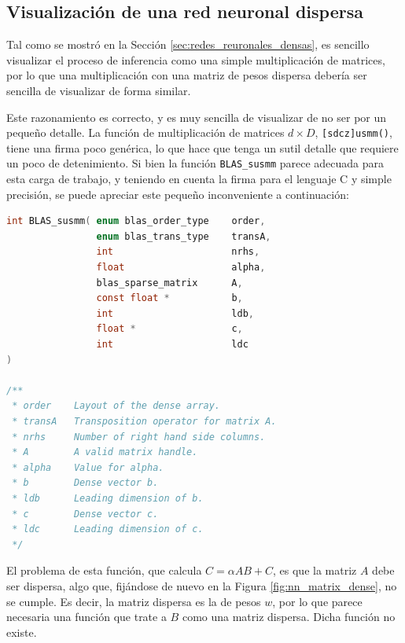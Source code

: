 \subsection{Visualización de una red neuronal dispersa}
\label{ssec:visualizacion_nn_dispersa}
Tal como se mostró en la Sección \ref{sec:redes_reuronales_densas}, es sencillo visualizar el proceso de inferencia como una simple multiplicación de matrices, por lo que una multiplicación con una matriz de pesos dispersa debería ser sencilla de visualizar de forma similar.

Este razonamiento es correcto, y es muy sencilla de visualizar de no ser por un pequeño detalle. La función de multiplicación de matrices $d\times D$, \texttt{[sdcz]usmm()}, tiene una firma poco genérica, lo que hace que tenga un sutil detalle que requiere un poco de detenimiento. Si bien la función \texttt{BLAS\_susmm} parece adecuada para esta carga de trabajo, y teniendo en cuenta la firma para el lenguaje C y simple precisión, se puede apreciar este pequeño inconveniente a continuación:

\begin{lstlisting}[language=C]
int BLAS_susmm( enum blas_order_type    order,
                enum blas_trans_type    transA,
                int                     nrhs,
                float                   alpha,
                blas_sparse_matrix      A,
                const float *           b,
                int                     ldb,
                float *                 c,
                int                     ldc 
)

/**
 * order    Layout of the dense array.
 * transA   Transposition operator for matrix A.
 * nrhs     Number of right hand side columns.
 * A        A valid matrix handle.
 * alpha    Value for alpha.
 * b        Dense vector b.
 * ldb      Leading dimension of b.
 * c        Dense vector c.
 * ldc      Leading dimension of c.
 */
\end{lstlisting}

El problema de esta función, que calcula $C = \alpha AB + C$, es que la matriz $A$ debe ser dispersa, algo que, fijándose de nuevo en la Figura \ref{fig:nn_matrix_dense}, no se cumple. Es decir, la matriz dispersa es la de pesos $w$, por lo que parece necesaria una función que trate a $B$ como una matriz dispersa. Dicha función no existe.

